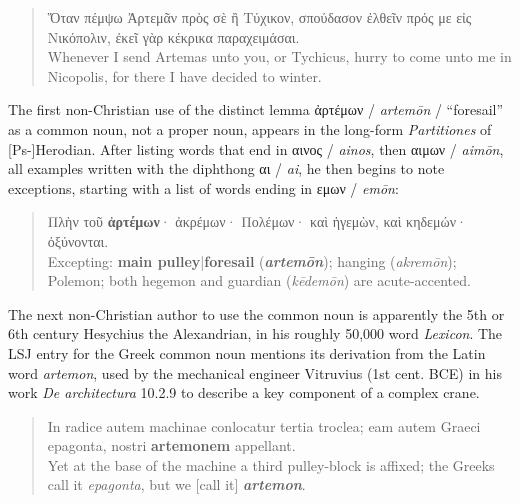 \vspace*{3mm} 
 \begin{quote}Ὅταν πέμψω Ἀρτεμᾶν πρὸς σὲ ἢ Τύχικον, %
  σπούδασον ἐλθεῖν πρός με εἰς Νικόπολιν, %
  ἐκεῖ γὰρ κέκρικα παραχειμάσαι. \\[1mm] %
 Whenever I send Artemas unto you, or Tychicus, %
 hurry to come unto me in Nicopolis, %
 for there I have decided to winter. %
 \end{quote} %
\vspace*{3mm}

The first non-Christian use of the distinct lemma ἀρτέμων / \textit{artemōn} / “foresail” as a common noun, %
not a proper noun, %
appears in the long-form \textit{Partitiones} of [Ps-]Herodian. %
After listing words that end in αινος / \textit{ainos}, then αιμων / \textit{aimōn}, %
all examples written with the diphthong αι / \textit{ai}, %
he then begins to note exceptions, starting with a list of words ending in εμων / \textit{emōn}: %

\vspace*{3mm} 
 \begin{quote}Πλὴν τοῦ \textbf{ἀρτέμων}· ἀκρέμων· Πολέμων· καὶ ἡγεμὼν,
 καὶ κηδεμών· ὀξύνονται. \\[1mm] %
 Excepting: \textbf{main pulley}|\textbf{foresail} (\textbf{\textit{artemōn}}); hanging (\textit{akremōn}); %
 Polemon; both hegemon and guardian (\textit{kēdemōn}) are acute-accented. %
 \end{quote} %
\clearpage

The next non-Christian author to use the common noun is apparently the 5th or 6th century %
Hesychius the Alexandrian, in his roughly 50,000 word \textit{Lexicon}. %
The LSJ entry for the Greek common noun mentions its derivation from the Latin word %
\textit{artemon}, used by the mechanical engineer Vitruvius (1st cent. BCE) in his work \textit{De architectura} 10.2.9 %
to describe a key component of a complex crane. %

\vspace*{2mm} 
 \begin{quote}In radice autem machinae conlocatur tertia troclea; %
 eam autem Graeci epagonta, nostri \textbf{artemonem} appellant. \\[1mm] %
 Yet at the base of the machine a third pulley-block is affixed; %
 the Greeks call it \textit{epagonta}, but we [call it] \textbf{\textit{artemon}}. \end{quote} %
 \vspace*{2mm}

